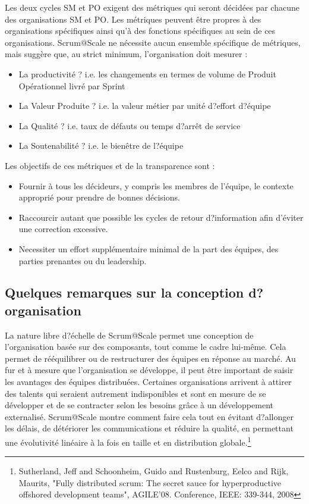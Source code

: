 \documentclass[12pt,a4paper,parskip=full]{scrartcl}
\begin{document}
Les deux cycles SM et PO exigent des métriques qui seront décidées par chacune des
organisations SM et PO. Les métriques peuvent être propres à des organisations
spécifiques ainsi qu'à des fonctions spécifiques au sein de ces organisations.
Scrum@Scale ne nécessite aucun ensemble spécifique de métriques, mais suggère que,
au strict minimum, l'organisation doit mesurer :
\begin{itemize}
\item La productivité ? i.e. les changements en termes de volume de Produit
Opérationnel livré par Sprint
\item La Valeur Produite ? i.e. la valeur métier par unité d?effort d?équipe
\item La Qualité ? i.e. taux de défauts ou temps d?arrêt de service
\item La Soutenabilité ? i.e. le bienêtre de l?équipe
\end{itemize}
Les objectifs de ces métriques et de la transparence sont :
\begin{itemize}
  \item Fournir à tous les décideurs, y compris les membres de l'équipe, le contexte
approprié pour prendre de bonnes décisions.
\item Raccourcir autant que possible les cycles de retour d?information afin d'éviter
une correction excessive.
\item Necessiter un effort supplémentaire minimal de la part des équipes, des parties
prenantes ou du leadership.
 \end{itemize}

\subsection{Quelques remarques sur la conception d?organisation}
La nature libre d?échelle de Scrum@Scale permet une conception de l'organisation
basée sur des composants, tout comme le cadre lui-même. Cela permet de
rééquilibrer ou de restructurer des équipes en réponse au marché. Au fur et à mesure
que l'organisation se développe, il peut être important de saisir les avantages des
équipes distribuées. Certaines organisations arrivent à attirer des talents qui seraient
autrement indisponibles et sont en mesure de se développer et de se contracter selon
les besoins grâce à un développement externalisé. Scrum@Scale montre comment
faire cela tout en évitant d?allonger les délais, de détériorer les communications et
réduire la qualité, en permettant une évolutivité linéaire à la fois en taille et en
distribution globale.\footnote{Sutherland, Jeff and Schoonheim,
Guido and Rustenburg, Eelco and Rijk, Maurits, "Fully distributed scrum:
The secret sauce for hyperproductive offshored development teams",
AGILE'08. Conference, IEEE: 339-344, 2008}
\end{document}
